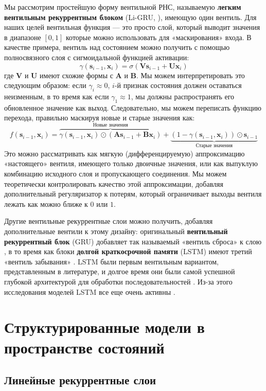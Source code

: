 Мы рассмотрим простейшую форму вентильной РНС, называемую \textbf{легким вентильным рекуррентным блоком} (Li-GRU, \cite{ravanelli2018light}), имеющую один вентиль. Для наших целей вентильная функция — это просто слой, который выводит значения в диапазоне $[0,1]$ которые можно использовать для «маскирования» входа. В качестве примера, вентиль над состоянием можно получить с помощью полносвязного слоя с сигмоидальной функцией активации:
%
$$
\gamma(\mathbf{s}_{i-1}, \mathbf{x}_i)=\sigma\left(\mathbf{V}\mathbf{s}_{i-1}+\mathbf{U}\mathbf{x}_i\right)
$$
%
где $\mathbf{V}$ и $\mathbf{U}$ имеют схожие формы с $\mathbf{A}$ и $\mathbf{B}$. Мы можем интерпретировать это следующим образом: если $\gamma_i \approx 0$, $i$-й признак состояния должен оставаться неизменным, в то время как если $\gamma_1 \approx 1$, мы должны распространять его обновленное значение как выход. Следовательно, мы можем переписать функцию перехода, правильно маскируя новые и старые значения как:
%
$$
f(\mathbf{s}_{i-1}, \mathbf{x}_i) = \overbrace{\gamma(\mathbf{s}_{i-1}, \mathbf{x}_i)\odot\left(\mathbf{A}\mathbf{s}_{i-1}+\mathbf{B}\mathbf{x}_i\right)}^{\text{Новые значения}} + \underbrace{(1-\gamma(\mathbf{s}_{i-1}, \mathbf{x}_i))\odot\mathbf{s}_{i-1}}_{\text{Старые значения}}
$$
%
Это можно рассматривать как мягкую (дифференцируемую) аппроксимацию «настоящего» вентиля, имеющего только двоичные значения, или как выпуклую комбинацию исходного слоя и пропускающего соединения. Мы можем теоретически контролировать качество этой аппроксимации, добавляя дополнительный регуляризатор к потерям, который ограничивает выходы вентиля лежать как можно ближе к $0$ или $1$. 

Другие вентильные рекуррентные слои можно получить, добавляя дополнительные вентили к этому дизайну: оригинальный \textbf{вентильный рекуррентный блок} (GRU) добавляет так называемый «вентиль сброса» к слою \cite{cho2014learning}, в то время как блоки \textbf{долгой краткосрочной памяти} (LSTM) имеют третий «вентиль забывания» \cite{hochreiter1997long}. LSTM были первым вентильным вариантом, представленным в литературе, и долгое время они были самой успешной глубокой архитектурой для обработки последовательностей \cite{schmidhuber2015deep}. Из-за этого исследования моделей LSTM все еще очень активны \cite{beck2024xlstm}.

\section{Структурированные модели в пространстве состояний}
\subsection{Линейные рекуррентные слои}


